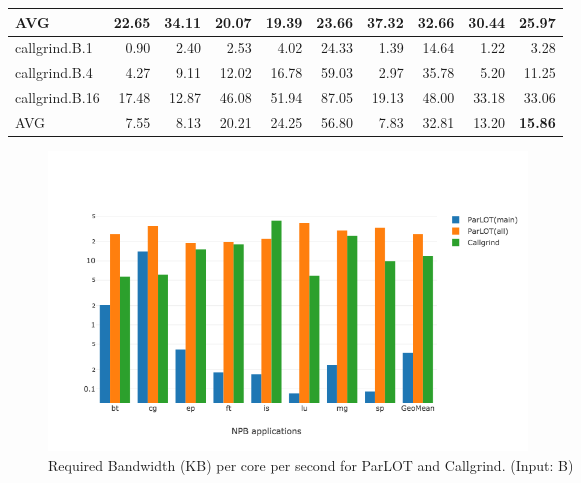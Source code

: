 \begin{table}[]
\begin{center}
\begin{tabular}{|l|rrrrrrrr|r|}
 \hline
 AVG            & 22.65 & 34.11 & 20.07 & 19.39 & 23.66 & 37.32 & 32.66 & 30.44 & \textbf{25.97} \\
 \hline
 callgrind.B.1  &  0.90 &  2.40 &  2.53 &  4.02 & 24.33 &  1.39 & 14.64 &  1.22 &  3.28 \\
 callgrind.B.4  &  4.27 &  9.11 & 12.02 & 16.78 & 59.03 &  2.97 & 35.78 &  5.20 & 11.25 \\
 callgrind.B.16 & 17.48 & 12.87 & 46.08 & 51.94 & 87.05 & 19.13 & 48.00 & 33.18 & 33.06 \\
 \hline
 AVG            &  7.55 &  8.13 & 20.21 & 24.25 & 56.80 &  7.83 & 32.81 & 13.20 & \textbf{15.86} \\
\hline
\end{tabular}
\end{center}
\end{table}


\begin{figure}[!t]
\centering
\includegraphics[width=5in]{figs.psc/chartAvg_bw_B_p3_5.png}
\caption{ Required Bandwidth (KB) per core per second for ParLOT and Callgrind.  
(Input: B)}
\label{chartAvg_bw_B_p3_5}
\end{figure}
